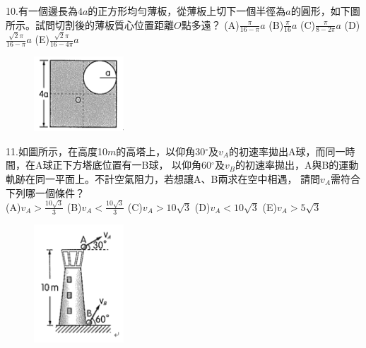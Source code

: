 \documentclass[cn,10pt,math=newtx,chinesefont=founder,device=ig]{elegantbook}
\begin{document}
\begin{example}
   10.有一個邊長為$4a$的正方形均勻薄板，從薄板上切下一個半徑為$a$的圓形，如下圖所示。試問切割後的薄板質心位置距離$O$點多遠？
   (A)$\frac{\pi}{16-\pi}a$ (B)$\frac{\pi}{16}a$ (C)$\frac{\pi}{8-2\pi}a$ 
   (D)$\frac{\sqrt{2} \pi}{16-\pi}a$ (E)$\frac{\sqrt{2} \pi}{16-4\pi}a$\\
    \rightline{[成德高中教甄109]}
\end{example}
\begin{solution}
    
\end{solution}
\begin{figure}[htbp]
    \flushright
    \includegraphics[width=0.3\textwidth]{image/109成德10.png}
  \end{figure}
\newpage

\begin{example}
   11.如圖所示，在高度10$m$的高塔上，以仰角30$^\circ$及$v_A$的初速率拋出A球，而同一時間，在A球正下方塔底位置有一B球，
   以仰角60$^\circ$及$v_B$的初速率拋出，A與B的運動軌跡在同一平面上。不計空氣阻力，若想讓A、B兩求在空中相遇，
   請問$v_A$需符合下列哪一個條件？\\
   (A)$v_A > \frac{10\sqrt{3}}{3}$ (B)$v_A < \frac{10\sqrt{3}}{3}$ (C)$v_A > 10\sqrt{3}$ 
   (D)$v_A < 10\sqrt{3}$ (E)$v_A > 5\sqrt{3}$\\
    \rightline{[成德高中教甄109]}
\end{example}
\begin{solution}
    
\end{solution}
\begin{figure}[htbp]
    \flushright
    \includegraphics[width=0.3\textwidth]{image/109成德11.png}
  \end{figure}
\newpage
\end{document}
